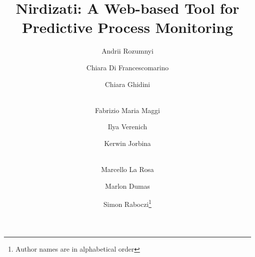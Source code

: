 \documentclass[runningheads,a4paper]{llncs}
\begin{document}
\mainmatter  %

\title{Nirdizati: A Web-based Tool for Predictive Process Monitoring}


%
%
\author{Andrii Rozumnyi  \and Chiara Di Francescomarino \and Chiara Ghidini  \and \\ Fabrizio Maria Maggi \and Ilya Verenich \and Kerwin Jorbina \and\\ Marcello La Rosa \and  Marlon Dumas \and Simon Raboczi\thanks{Author names are in alphabetical order}}


%
%

\maketitle
\end{document}
